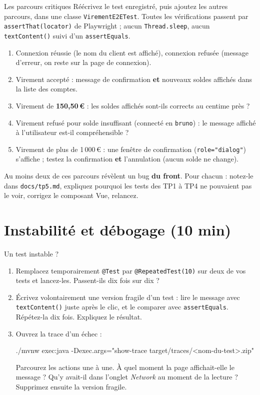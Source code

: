 \documentclass[11pt]{article}
\begin{document}
\begin{exobox}{Les parcours critiques}
Réécrivez le test enregistré, puis ajoutez les autres parcours, dans une classe \texttt{VirementE2ETest}. Toutes les vérifications passent par \texttt{assertThat(locator)} de Playwright ; aucun \texttt{Thread.sleep}, aucun \texttt{textContent()} suivi d'un \texttt{assertEquals}.
\begin{enumerate}[leftmargin=1.4em]
  \item Connexion réussie (le nom du client est affiché), connexion refusée (message d'erreur, on reste sur la page de connexion).
  \item Virement accepté : message de confirmation \textbf{et} nouveaux soldes affichés dans la liste des comptes.
  \item Virement de \textbf{150,50\,\euro{}} : les soldes affichés sont-ils corrects au centime près ?
  \item Virement refusé pour solde insuffisant (connecté en \texttt{bruno}) : le message affiché à l'utilisateur est-il compréhensible ?
  \item Virement de plus de 1\,000\,\euro{} : une fenêtre de confirmation (\texttt{role="dialog"}) s'affiche ; testez la confirmation \textbf{et} l'annulation (aucun solde ne change).
\end{enumerate}
Au moins deux de ces parcours révèlent un bug \textbf{du front}. Pour chacun : notez-le dans \texttt{docs/tp5.md}, expliquez pourquoi les tests des TP1 à TP4 ne pouvaient pas le voir, corrigez le composant Vue, relancez.
\end{exobox}

\section{Instabilité et débogage (10 min)}

\begin{exobox}{Un test instable ?}
\begin{enumerate}[leftmargin=1.4em]
  \item Remplacez temporairement \texttt{@Test} par \texttt{@RepeatedTest(10)} sur deux de vos tests et lancez-les. Passent-ils dix fois sur dix ?
  \item Écrivez volontairement une version fragile d'un test : lire le message avec \texttt{textContent()} juste après le clic, et le comparer avec \texttt{assertEquals}. Répétez-la dix fois. Expliquez le résultat.
  \item Ouvrez la trace d'un échec :
\begin{codebox}
./mvnw exec:java -Dexec.args="show-trace target/traces/<nom-du-test>.zip"
\end{codebox}
  Parcourez les actions une à une. À quel moment la page affichait-elle le message ? Qu'y avait-il dans l'onglet \textit{Network} au moment de la lecture ? Supprimez ensuite la version fragile.
\end{enumerate}
\end{exobox}
\end{document}
